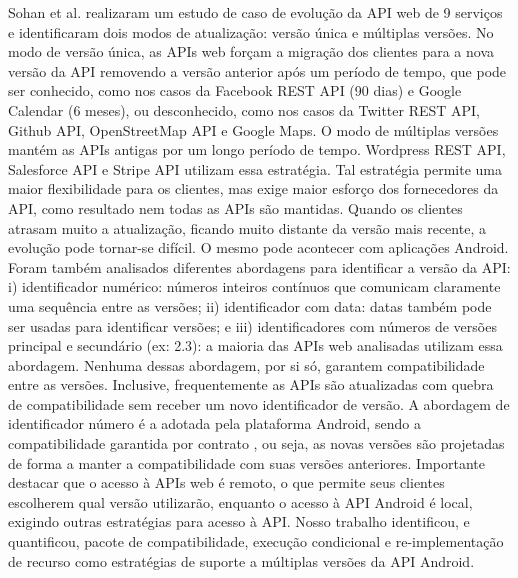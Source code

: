 Sohan et al. \cite{Sohan2015} realizaram um estudo de caso de evolução da API
web de 9 serviços e identificaram dois modos de atualização: versão única e
múltiplas versões. No modo de versão única, as APIs web forçam a migração dos
clientes para a nova versão da API removendo a versão anterior após um período
de tempo, que pode ser conhecido, como nos casos da Facebook REST API (90 dias)
e Google Calendar (6 meses), ou desconhecido, como nos casos da Twitter REST API,
Github API, OpenStreetMap API e Google Maps. O modo de múltiplas versões mantém as APIs
antigas por um longo período de tempo. Wordpress REST API, Salesforce API e Stripe
API utilizam essa estratégia. Tal estratégia permite uma maior flexibilidade para os
clientes, mas exige maior esforço dos fornecedores da API, como resultado nem todas
as APIs são mantidas. Quando os clientes atrasam muito a atualização, ficando muito
distante da versão mais recente, a evolução pode tornar-se difícil. O mesmo pode acontecer
com aplicações Android. Foram também analisados diferentes abordagens para identificar
a versão da API: i) identificador numérico: números inteiros contínuos que comunicam
claramente uma sequência entre as versões; ii) identificador com data: datas também
pode ser usadas para identificar versões; e iii) identificadores com números de versões
principal e secundário (ex: 2.3): a maioria das APIs web analisadas utilizam essa
abordagem. Nenhuma dessas abordagem, por si só, garantem compatibilidade entre as versões.
Inclusive, frequentemente as APIs são atualizadas com quebra de compatibilidade sem receber
um novo identificador de versão. A abordagem de identificador número é a adotada pela
plataforma Android, sendo a compatibilidade garantida por contrato \cite{ApiLevels},
ou seja, as novas versões são projetadas de forma a manter a compatibilidade com suas
versões anteriores.   Importante destacar que o acesso à APIs web é remoto, o que permite
seus clientes escolherem qual versão utilizarão, enquanto o acesso à API Android é local,
exigindo outras estratégias para acesso à API. Nosso trabalho identificou, e quantificou,
pacote de compatibilidade, execução condicional e re-implementação de recurso como estratégias
de suporte a múltiplas versões da API Android.